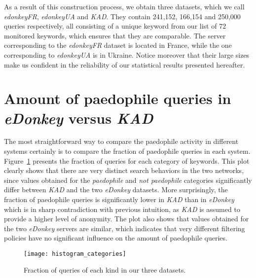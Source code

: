\documentclass[a4paper,oneside,12pt]{article}
\newcommand{\edonkey}{{\em eDonkey}\xspace}
\newcommand{\edonkeydsfr}{{\em edonkeyFR}\xspace}
\newcommand{\edonkeydsua}{{\em edonkeyUA}\xspace}
\newcommand{\kad}{{\em KAD}\xspace}
\newcommand{\paedo}{{\em paedophile}\xspace}
\newcommand{\notpaedo}{{\em not paedophile}\xspace}
\begin{document}
As a result of this construction process, we obtain three datasets, which we call \edonkeydsfr, \edonkeydsua and \kad. They contain 241,152, 166,154 and 250,000 queries respectively, all consisting of a unique keyword from our list of 72 monitored keywords, which ensures that they are comparable. The server corresponding to the \edonkeydsfr dataset is located in France, while the one corresponding to \edonkeydsua is in Ukraine. Notice moreover that their large sizes make us confident in the reliability of our statistical results presented hereafter.


\section{Amount of paedophile queries in \edonkey versus \kad}
\label{sec-stats}

The most straightforward way to compare the paedophile activity in different systems certainly is to compare the fraction of paedophile queries in each system. Figure~\ref{fig-histocateg} presents the fraction of queries for each category of keywords. This plot clearly shows that there are very distinct search behaviors in the two networks, since values obtained for the \paedo and \notpaedo categories significantly differ between \kad and the two \edonkey datasets. More surprisingly, the fraction of paedophile queries is significantly lower in \kad than in \edonkey which is in sharp contradiction with previous intuition, as \kad is assumed to provide a higher level of anonymity. The plot also shows that values obtained for the two \edonkey servers are similar, which indicates that very different filtering policies have no significant influence on the amount of paedophile queries.

\begin{figure}[!h]
\centering
\texttt{[image: histogram\_categories]}
\caption{
Fraction of queries of each kind in our three datasets.
}
\label{fig-histocateg}
\end{figure}
\end{document}
